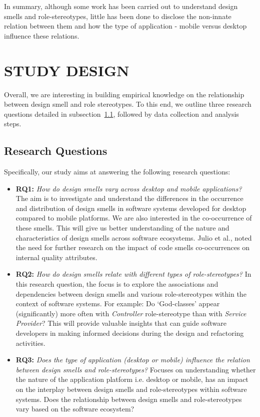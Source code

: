 \documentclass[AMA,Times1COL]{WileyNJDv5} %
\begin{document}
In summary, although some work has been carried out to understand design smells and role-stereotypes, little has been done to disclose the non-innate relation between them and how the type of application - mobile versus desktop influence these relations.

\section{STUDY DESIGN}\label{sec:method}
Overall, we are interesting in building empirical knowledge on the relationship between design smell and role stereotypes. To this end, we outline three research questions detailed in subsection~\ref{sec:researchquestion}, followed by data collection and analysis steps.
\subsection{Research Questions}\label{sec:researchquestion}
Specifically, our study aims at answering the following research questions: 
\begin{itemize}
	\item \textbf{RQ1:} \textit{How do design smells vary across desktop and mobile applications?} The aim is to investigate and understand the differences in the occurrence and distribution of design smells in software systems developed for desktop compared to mobile platforms. We are also interested in the co-occurrence of these smells. This will give us better understanding of the nature and characteristics of design smells across software ecosystems. Julio et al.,\cite{martins2020code} noted the need for further research on the impact of code smells co-occurrences on internal quality attributes.
	\item \textbf{RQ2:} \textit{How do design smells relate with different types of role-stereotypes?} In this research question, the focus is to explore the associations and dependencies between design smells and various role-stereotypes within the context of software systems. For example: Do `God-classes’ appear (significantly) more often with \textit{Controller} role-stereotype than with \textit{Service Provider}? This will provide valuable insights that can guide software developers in making informed decisions during the design and refactoring activities.
	\item \textbf{RQ3:} \textit{Does the type of application (desktop or mobile) influence the relation between design smells and role-stereotypes?} Focuses on understanding whether the nature of the application platform i.e. desktop or mobile, has an impact on the interplay between design smells and role-stereotypes within software systems. Does  the relationship between design smells and role-stereotypes vary based on the software ecosystem?
\end{itemize} 
\end{document}
